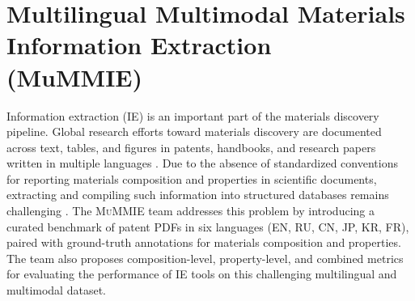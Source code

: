





\section{Multilingual Multimodal Materials Information Extraction (MuMMIE)}



Information extraction (IE) is an important part of the materials discovery pipeline. Global research efforts toward materials discovery are documented across text, tables, and figures in patents, handbooks, and research papers written in multiple languages \cite{puccetti2021simple}. Due to the absence of standardized conventions for reporting materials composition and properties in scientific documents, extracting and compiling such information into structured databases remains challenging \cite{hira2025matskraft, circi2024well, kosonocky2024mining}. The \textsc{MuMMIE} team addresses this problem by introducing a curated benchmark of patent PDFs in six languages (EN, RU, CN, JP, KR, FR), paired with ground-truth annotations for materials composition and properties. The team also proposes composition-level, property-level, and combined metrics for evaluating the performance of IE tools on this challenging multilingual and multimodal dataset.

